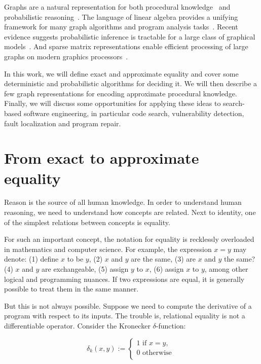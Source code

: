 \documentclass[11pt]{article}
\begin{document}
    Graphs are a natural representation for both procedural knowledge~\citep{allamanis2017learning} and probabilistic reasoning~\citep{pearl2014probabilistic}. The language of linear algebra provides a unifying framework for many graph algorithms and program analysis tasks~\citep{kepner2011graph}. Recent evidence suggests probabilistic inference is tractable for a large class of graphical models~\citep{choi2020probabilistic}. And sparse matrix representations enable efficient processing of large graphs on modern graphics processors~\citep{kepner2016mathematical}.

    In this work, we will define exact and approximate equality and cover some deterministic and probabilistic algorithms for deciding it. We will then describe a few graph representations for encoding approximate procedural knowledge. Finally, we will discuss some opportunities for applying these ideas to search-based software engineering, in particular code search, vulnerability detection, fault localization and program repair.


    \section{From exact to approximate equality}\label{sec:definitions}

    Reason is the source of all human knowledge. In order to understand human reasoning, we need to understand how concepts are related. Next to identity, one of the simplest relations between concepts is equality.

    For such an important concept, the notation for equality is recklessly overloaded in mathematics and computer science. For example, the expression $x = y$ may denote: (1) define $x$ to be $y$, (2) $x$ and $y$ are the same, (3) are $x$ and $y$ the same? (4) $x$ and $y$ are exchangeable, (5) assign $y$ to $x$, (6) assign $x$ to $y$, among other logical and programming nuances. If two expressions are equal, it is generally possible to treat them in the same manner.

    But this is not always possible. Suppose we need to compute the derivative of a program with respect to its inputs. The trouble is, relational equality is not a differentiable operator. Consider the Kronecker $\delta$-function: %

    $$
    \delta_k(x, y) :=
    \begin{cases}
        1 \text{ if } x = y, \\
        0 \text{ otherwise }\\
    \end{cases}
    $$
\end{document}
